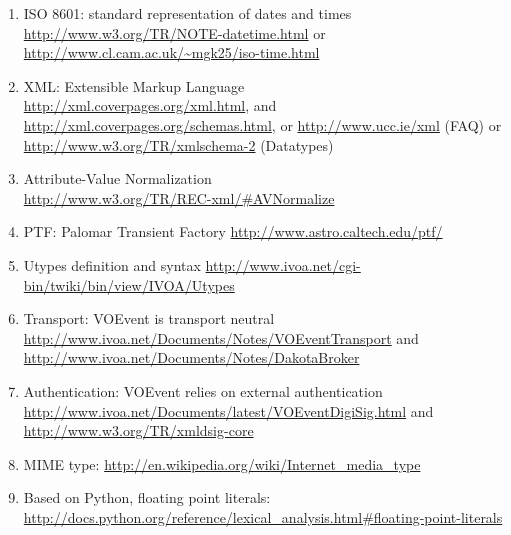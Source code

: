 \documentclass[11pt,a4paper]{ivoa}
\begin{document}
\begin{enumerate}
\item\label{bib28} ISO 8601: standard representation of dates and times \\
\url{http://www.w3.org/TR/NOTE-datetime.html} or \url{http://www.cl.cam.ac.uk/~mgk25/iso-time.html}
\item\label{bib29} XML: Extensible Markup Language\\
\url{http://xml.coverpages.org/xml.html}, and  \url{http://xml.coverpages.org/schemas.html}, or \url{http://www.ucc.ie/xml} (FAQ) or \url{http://www.w3.org/TR/xmlschema-2} (Datatypes) 
\item\label{bib30} Attribute-Value Normalization\\
\url{http://www.w3.org/TR/REC-xml/#AVNormalize} 
\item\label{bib31} PTF: Palomar Transient Factory \url{http://www.astro.caltech.edu/ptf/}
\item\label{bib32} Utypes definition and syntax \url{http://www.ivoa.net/cgi-bin/twiki/bin/view/IVOA/Utypes}
\item\label{bib33} Transport: VOEvent is transport neutral \\
\url{http://www.ivoa.net/Documents/Notes/VOEventTransport} and \\
\url{http://www.ivoa.net/Documents/Notes/DakotaBroker} 
\item\label{bib34} Authentication: VOEvent relies on external authentication \\
\url{http://www.ivoa.net/Documents/latest/VOEventDigiSig.html}  and \url{http://www.w3.org/TR/xmldsig-core}
\item\label{bib35} MIME type: \url{http://en.wikipedia.org/wiki/Internet_media_type}
\item\label{bib36} Based on Python, floating point literals:\\
\url{http://docs.python.org/reference/lexical_analysis.html#floating-point-literals}
\end{enumerate}
\end{document}
